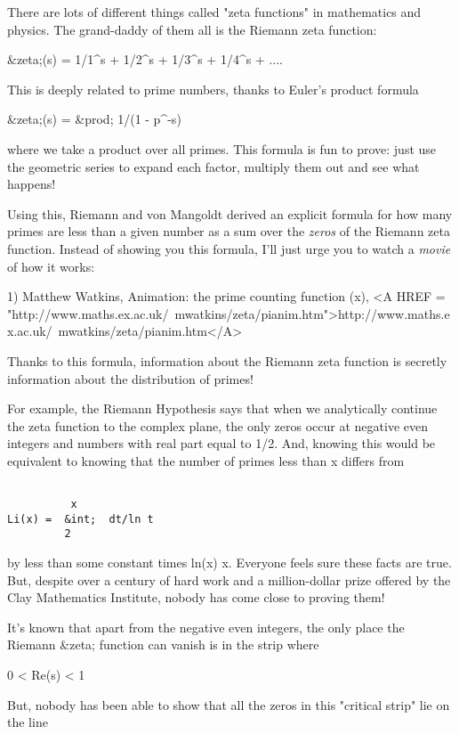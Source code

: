 


There are lots of different things called "zeta functions" 
in mathematics 
and physics.  The grand-daddy of them all is the Riemann zeta function:

&zeta;(s) = 1/1^{s} + 1/2^{s} + 1/3^{s} + 1/4^{s} + ....

This is deeply related to prime numbers, thanks to Euler's product formula

&zeta;(s) = &prod; 1/(1 - p^{-s})

where we take a product over all primes.  This formula is fun to prove: 
just use the geometric series to expand each factor, multiply them out 
and see what happens!

Using this, Riemann and von Mangoldt derived an explicit formula 
for how many primes are less than a given number as a sum over the 
\emph{zeros} of the Riemann zeta function.   Instead of showing you 
this formula, I'll just urge you to watch a \emph{movie} of how it works:

1) Matthew Watkins, Animation: the prime counting function
\pi (x), <A HREF = "http://www.maths.ex.ac.uk/~mwatkins/zeta/pianim.htm">http://www.maths.ex.ac.uk/~mwatkins/zeta/pianim.htm</A>  

Thanks to this formula, information about the Riemann zeta function 
is secretly information about the distribution of primes!  

For example, the Riemann Hypothesis says that when we analytically 
continue the zeta function to the complex plane, the only zeros occur 
at negative even integers and numbers with real part equal to 1/2.
And, knowing this would be equivalent to knowing that the number of 
primes less than x differs from

\begin{verbatim}

          x
Li(x) =  &int;  dt/ln t  
         2
\end{verbatim}
    
by less than some constant times ln(x) \sqrt x.  
Everyone feels
sure these facts are true.  But, despite over a century of hard work 
and a million-dollar prize offered by the Clay Mathematics Institute,
nobody has come close to proving them!

It's known that apart from the negative even integers, the only 
place the Riemann &zeta; function can vanish is in the strip where

0 < Re(s) < 1

But, nobody has been able to show that all the zeros in this 
"critical strip" lie on the line 

